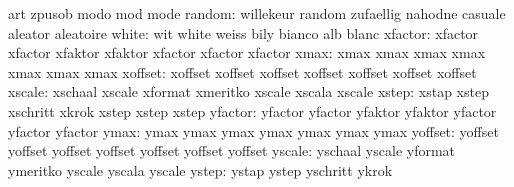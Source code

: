                            art                       zpusob
                           modo                      mod
                           mode
                   random: willekeur                 random
                           zufaellig                 nahodne
                           casuale                   aleator
                           aleatoire
                    white: wit                       white
                           weiss                     bily
                           bianco                    alb
                           blanc
                  xfactor: xfactor                   xfactor
                           xfaktor                   xfaktor
                           xfactor                   xfactor
                           xfactor
                     xmax: xmax                      xmax
                           xmax                      xmax
                           xmax                      xmax
                           xmax
                  xoffset: xoffset                   xoffset
                           xoffset                   xoffset
                           xoffset                   xoffset
                           xoffset
                   xscale: xschaal                   xscale
                           xformat                   xmeritko
                           xscale                    xscala
                           xscale
                    xstep: xstap                     xstep
                           xschritt                  xkrok
                           xstep                     xstep
                           xstep
                  yfactor: yfactor                   yfactor
                           yfaktor                   yfaktor
                           yfactor                   yfactor
                           yfactor
                     ymax: ymax                      ymax
                           ymax                      ymax
                           ymax                      ymax
                           ymax
                  yoffset: yoffset                   yoffset
                           yoffset                   yoffset
                           yoffset                   yoffset
                           yoffset
                   yscale: yschaal                   yscale
                           yformat                   ymeritko
                           yscale                    yscala
                           yscale
                    ystep: ystap                     ystep
                           yschritt                  ykrok

